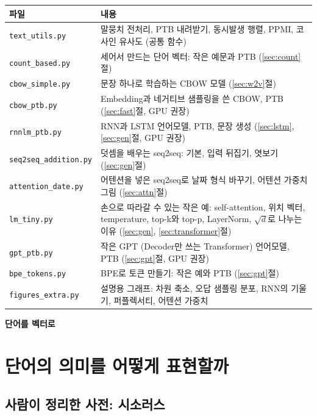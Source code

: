 \documentclass[11pt,a4paper]{article}
\newcommand{\partbanner}[1]{%
  \par\vspace{0.8em}%
  \begin{tcolorbox}[colback=deepblue,colframe=deepblue,arc=1.5mm,boxrule=0pt,left=4mm,top=2mm,bottom=2mm]
  {\color{white}\large\bfseries #1}
  \end{tcolorbox}\par}
\begin{document}
\begin{center}
\begin{tabular}{@{}lp{100mm}@{}}
\toprule
파일 & 내용 \\
\midrule
\texttt{text\_utils.py} & 말뭉치 전처리, PTB 내려받기, 동시발생 행렬, PPMI, 코사인 유사도 (공통 함수) \\
\texttt{count\_based.py} & 세어서 만드는 단어 벡터: 작은 예문과 PTB (\ref{sec:count}절) \\
\texttt{cbow\_simple.py} & 문장 하나로 학습하는 CBOW 모델 (\ref{sec:w2v}절) \\
\texttt{cbow\_ptb.py} & Embedding과 네거티브 샘플링을 쓴 CBOW, PTB (\ref{sec:fast}절, GPU 권장) \\
\texttt{rnnlm\_ptb.py} & RNN과 LSTM 언어모델, PTB, 문장 생성 (\ref{sec:lstm}, \ref{sec:gen}절, GPU 권장) \\
\texttt{seq2seq\_addition.py} & 덧셈을 배우는 seq2seq: 기본, 입력 뒤집기, 엿보기 (\ref{sec:gen}절) \\
\texttt{attention\_date.py} & 어텐션을 넣은 seq2seq로 날짜 형식 바꾸기, 어텐션 가중치 그림 (\ref{sec:attn}절) \\
\texttt{lm\_tiny.py} & 손으로 따라갈 수 있는 작은 예: self-attention, 위치 벡터, temperature, top-k와 top-p, LayerNorm, $\sqrt d$로 나누는 이유 (\ref{sec:gen}, \ref{sec:transformer}절) \\
\texttt{gpt\_ptb.py} & 작은 GPT (Decoder만 쓰는 Transformer) 언어모델, PTB (\ref{sec:gpt}절, GPU 권장) \\
\texttt{bpe\_tokens.py} & BPE로 토큰 만들기: 작은 예와 PTB (\ref{sec:gpt}절) \\
\texttt{figures\_extra.py} & 설명용 그래프: 차원 축소, 오답 샘플링 분포, RNN의 기울기, 퍼플렉서티, 어텐션 가중치 \\
\bottomrule
\end{tabular}
\end{center}

\partbanner{단어를 벡터로}

\section{단어의 의미를 어떻게 표현할까}\label{sec:meaning}

\subsection{사람이 정리한 사전: 시소러스}
\end{document}
